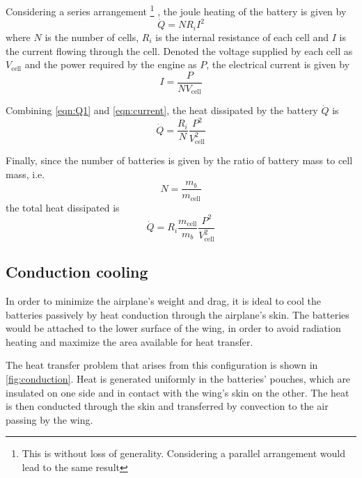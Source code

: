 Considering a series arrangement%
\footnote{This is without loss of generality. Considering a parallel arrangement would lead to the same result}%
, the joule heating of the battery is given by 
\begin{equation}
\label{eqn:Q1}
\dot{Q} =  N R_i I^2
\end{equation}
where $N$ is the number of cells, $R_i$ is the internal resistance of each cell and $I$ is the current flowing through the cell. Denoted the voltage supplied by each cell as $V_\text{cell}$ and the power required by the engine as $P$, the electrical current is given by
\begin{equation}
\label{eqn:current}
    I = \frac{P}{N V_\text{cell}}
\end{equation}

Combining \cref{eqn:Q1} and \cref{eqn:current}, the heat dissipated by the battery $\dot{Q}$ is
\begin{equation}
\dot{Q} = \frac{R_i}{N} \frac{P^2}{V_\text{cell}^2}
\end{equation}

Finally, since the number of batteries is given by the ratio of battery mass to cell mass, i.e.
\begin{equation}
N = \frac{m_b}{m_\text{cell}}
\end{equation}
the total heat dissipated is
\begin{equation}
    \dot{Q}=R_i \frac{m_\text{cell}}{m_b} \frac{P^2}{V_\text{cell}^2}
\end{equation}


\subsection{Conduction cooling}
\label{sec:cc}
In order to minimize the airplane's weight and drag, it is ideal to cool the batteries passively by heat conduction through the airplane's skin. The batteries would be attached to the lower surface of the wing, in order to avoid radiation heating and maximize the area available for heat transfer.

The heat transfer problem that arises from this configuration is shown in \cref{fig:conduction}. Heat is generated uniformly in the batteries' pouches, which are insulated on one side and in contact with the wing's skin on the other. The heat is then conducted through the skin and transferred by convection to the air passing by the wing.

